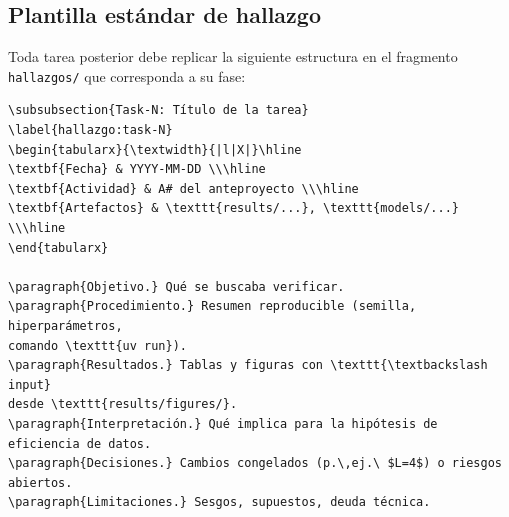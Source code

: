 \documentclass[12pt,letterpaper]{article}
\begin{document}
\subsection{Plantilla estándar de hallazgo}

Toda tarea posterior debe replicar la siguiente estructura en el fragmento
\texttt{hallazgos/} que corresponda a su fase:

\begin{verbatim}
\subsubsection{Task-N: Título de la tarea}
\label{hallazgo:task-N}
\begin{tabularx}{\textwidth}{|l|X|}\hline
\textbf{Fecha} & YYYY-MM-DD \\\hline
\textbf{Actividad} & A# del anteproyecto \\\hline
\textbf{Artefactos} & \texttt{results/...}, \texttt{models/...} \\\hline
\end{tabularx}

\paragraph{Objetivo.} Qué se buscaba verificar.
\paragraph{Procedimiento.} Resumen reproducible (semilla, hiperparámetros,
comando \texttt{uv run}).
\paragraph{Resultados.} Tablas y figuras con \texttt{\textbackslash input}
desde \texttt{results/figures/}.
\paragraph{Interpretación.} Qué implica para la hipótesis de eficiencia de datos.
\paragraph{Decisiones.} Cambios congelados (p.\,ej.\ $L=4$) o riesgos abiertos.
\paragraph{Limitaciones.} Sesgos, supuestos, deuda técnica.
\end{verbatim}
\end{document}
